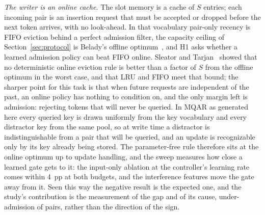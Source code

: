 
\textit{The writer is an online cache.} The slot memory is a cache of $S$
entries; each incoming pair is an insertion request that must be accepted or
dropped before the next token arrives, with no look-ahead. In that vocabulary
pair-only recency is FIFO eviction behind a perfect admission filter, the
capacity ceiling of Section~\ref{sec:protocol} is Belady's offline
optimum~\cite{belady1966study}, and H1 asks whether a learned admission policy
can beat FIFO online. Sleator and Tarjan~\cite{sleator1985amortized} showed
that no deterministic online eviction rule is better than a factor of $S$
from the offline optimum in the worst case, and that LRU and FIFO meet that
bound; the sharper point for this task is that when future requests are
independent of the past, an online policy has nothing to condition on, and
the only margin left is admission: rejecting tokens that will never be
queried. In MQAR as generated here every queried key is drawn uniformly from
the key vocabulary and every distractor key from the same pool, so at write
time a distractor is indistinguishable from a pair that will be queried, and
an update is recognizable only by its key already being stored. The
parameter-free rule therefore sits at the online optimum up to update
handling, and the sweep measures how close a learned gate gets to it: the
input-only ablation at the controller's learning rate comes within 4~pp at
both budgets, and the interference features move the gate away from it. Seen
this way the negative result is the expected one, and the study's
contribution is the measurement of the gap and of its cause, under-admission
of pairs, rather than the direction of the sign.

